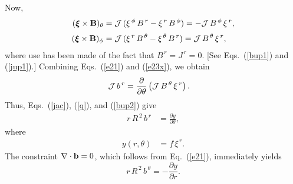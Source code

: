 \documentclass[12pt,prb,aps,notitlepage]{revtex4-1}
\newcommand {\bxi}{\mbox{\boldmath$\xi$}}
\begin{document}
Now, 
\begin{align}
(\bxi\times {\bf B})_\theta&= {\cal J}\,(\xi^{\,\phi}\,B^{\,r} - \xi^{\,r}\,B^{\,\phi}) = -{\cal J}\,B^{\,\phi}\,\xi^{\,r},\\[0.5ex]
(\bxi\times {\bf B})_\phi &= {\cal J}\,(\xi^{\,r}\,B^{\,\theta} - \xi^{\,\theta}\,B^{\,r})= {\cal J}\,B^{\,\theta}\,\xi^{\,r},\label{e23x}
\end{align}
where use has been made of  the fact that $B^{\,r}=J^{\,r}=0$. [See Eqs.~(\ref{bup1}) and (\ref{jup1}).]
 Combining Eqs.~(\ref{e21}) and (\ref{e23x}), we obtain
\begin{align}
{\cal J}\,b^{\,r} &= \frac{\partial}{\partial\theta}\left({\cal J}\,B^{\,\theta}\,\xi^{\,r}\right).
\end{align}
Thus, Eqs.~(\ref{jac}), (\ref{q}),  and (\ref{bup2}) give
\begin{align}\label{e41}
r\,R^{\,2}\,b^{\,r}& = \frac{\partial y}{\partial\theta},
\end{align}
where 
\begin{align}\label{e42}
y(r,\theta) &=f\,\xi^{\,r}.
\end{align}
The constraint $\nabla\cdot{\bf b} =0$, which follows from Eq.~(\ref{e21}),  immediately yields
\begin{equation}\label{e43y}
r\,R^{\,2}\,b^{\,\theta} = - \frac{\partial y}{\partial r}.
\end{equation}
\end{document}
